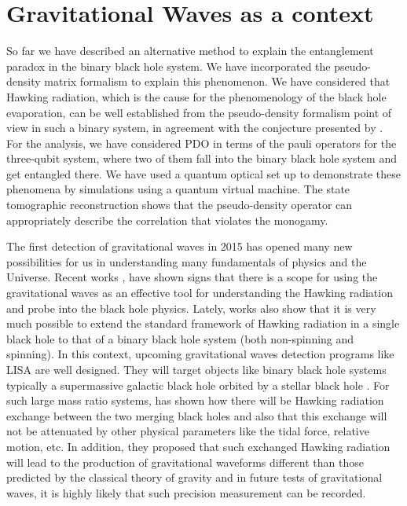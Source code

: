 \documentclass[fleqn,usenatbib]{mnras}
\begin{document}
\section{Gravitational Waves as a context}\label{sec4}
So far we have described an alternative method to explain the entanglement paradox in the binary black hole system. We have incorporated the pseudo-density matrix formalism to explain this phenomenon. We have considered that Hawking radiation, which is the cause for the phenomenology of the black hole evaporation, can be well established from the pseudo-density formalism point of view in such a binary system, in agreement with the conjecture presented by \citep{monogamy}. For the analysis, we have considered PDO in terms of the pauli operators for the three-qubit system, where two of them fall into the binary black hole system and get entangled there. We have used a quantum optical set up to demonstrate these phenomena by simulations using a quantum virtual machine. The state tomographic reconstruction shows that the pseudo-density operator can appropriately describe the correlation that violates the monogamy.

The first detection of gravitational waves in 2015 \citep{ligo,ligo2} has opened many new possibilities for us in understanding many fundamentals of physics and the Universe. Recent works \citep{grav,hr}, have shown signs that there is a  scope for using the gravitational waves as an effective tool for understanding the Hawking radiation and probe into the black hole physics. Lately, works also show \citep{r1,r2,r3,r4,r5,r6} that it is very much possible to extend the standard framework of Hawking radiation in a single black hole to that of a binary black hole system (both non-spinning and spinning). In this context, upcoming gravitational waves detection programs like LISA \citep{lisa} are well designed. They will target objects like binary black hole systems typically a supermassive galactic black hole orbited by a stellar black hole \citep{lisa}. For such large mass ratio systems, \citep{hr} has shown how there will be Hawking radiation exchange between the two merging black holes and also that this exchange will not be attenuated by other physical parameters like the tidal force, relative motion, etc. In addition, they proposed that such exchanged Hawking radiation will lead to the production of gravitational waveforms different than those predicted by the classical theory of gravity and in future tests of gravitational waves, it is highly likely that such precision measurement can be recorded.
\end{document}
